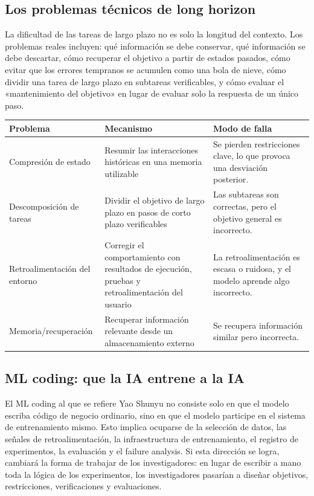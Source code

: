 \documentclass[a4paper]{article}
\begin{document}
\subsection{Los problemas técnicos de long horizon}

La dificultad de las tareas de largo plazo no es solo la longitud del contexto. Los problemas reales incluyen: qué información se debe conservar, qué información se debe descartar, cómo recuperar el objetivo a partir de estados pasados, cómo evitar que los errores tempranos se acumulen como una bola de nieve, cómo dividir una tarea de largo plazo en subtareas verificables, y cómo evaluar el «mantenimiento del objetivo» en lugar de evaluar solo la respuesta de un único paso.

\noindent\begin{tabularx}{\textwidth}{p{}p{}X}
\toprule
Problema & Mecanismo & Modo de falla \\
\midrule
Compresión de estado & Resumir las interacciones históricas en una memoria utilizable & Se pierden restricciones clave, lo que provoca una desviación posterior. \\
Descomposición de tareas & Dividir el objetivo de largo plazo en pasos de corto plazo verificables & Las subtareas son correctas, pero el objetivo general es incorrecto. \\
Retroalimentación del entorno & Corregir el comportamiento con resultados de ejecución, pruebas y retroalimentación del usuario & La retroalimentación es escasa o ruidosa, y el modelo aprende algo incorrecto. \\
Memoria/recuperación & Recuperar información relevante desde un almacenamiento externo & Se recupera información similar pero incorrecta. \\
\bottomrule
\end{tabularx}

\subsection{ML coding: que la IA entrene a la IA}

El ML coding al que se refiere Yao Shunyu no consiste solo en que el modelo escriba código de negocio ordinario, sino en que el modelo participe en el sistema de entrenamiento mismo. Esto implica ocuparse de la selección de datos, las señales de retroalimentación, la infraestructura de entrenamiento, el registro de experimentos, la evaluación y el failure analysis. Si esta dirección se logra, cambiará la forma de trabajar de los investigadores: en lugar de escribir a mano toda la lógica de los experimentos, los investigadores pasarían a diseñar objetivos, restricciones, verificaciones y evaluaciones.
\end{document}
